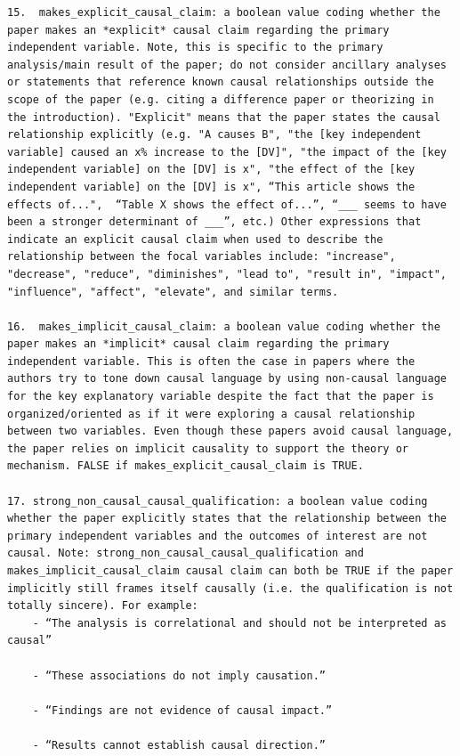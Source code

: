 \documentclass[12pt]{article}
\begin{document}
{\begin{Verbatim}[breaklines=true]
15.  makes_explicit_causal_claim: a boolean value coding whether the paper makes an *explicit* causal claim regarding the primary independent variable. Note, this is specific to the primary analysis/main result of the paper; do not consider ancillary analyses or statements that reference known causal relationships outside the scope of the paper (e.g. citing a difference paper or theorizing in the introduction). "Explicit" means that the paper states the causal relationship explicitly (e.g. "A causes B", "the [key independent variable] caused an x% increase to the [DV]", "the impact of the [key independent variable] on the [DV] is x", "the effect of the [key independent variable] on the [DV] is x", “This article shows the effects of...",  “Table X shows the effect of...”, “___ seems to have been a stronger determinant of ___”, etc.) Other expressions that indicate an explicit causal claim when used to describe the relationship between the focal variables include: "increase", "decrease", "reduce", "diminishes", "lead to", "result in", "impact", "influence", "affect", "elevate", and similar terms.

16.  makes_implicit_causal_claim: a boolean value coding whether the paper makes an *implicit* causal claim regarding the primary independent variable. This is often the case in papers where the authors try to tone down causal language by using non-causal language for the key explanatory variable despite the fact that the paper is organized/oriented as if it were exploring a causal relationship between two variables. Even though these papers avoid causal language, the paper relies on implicit causality to support the theory or mechanism. FALSE if makes_explicit_causal_claim is TRUE.

17. strong_non_causal_causal_qualification: a boolean value coding whether the paper explicitly states that the relationship between the primary independent variables and the outcomes of interest are not causal. Note: strong_non_causal_causal_qualification and makes_implicit_causal_claim causal claim can both be TRUE if the paper implicitly still frames itself causally (i.e. the qualification is not totally sincere). For example:
    - “The analysis is correlational and should not be interpreted as causal”
    
    - “These associations do not imply causation.”
    
    - “Findings are not evidence of causal impact.”
    
    - “Results cannot establish causal direction.”
    

\end{Verbatim}}
\end{document}
